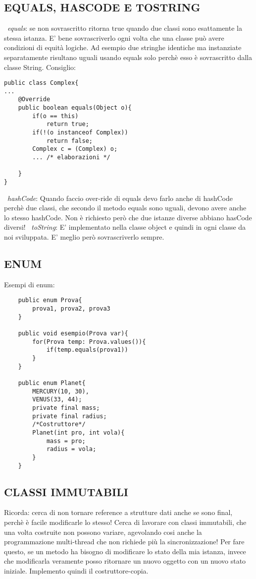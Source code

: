 \subsection{EQUALS, HASCODE E TOSTRING}
\noindent \textbullet\ \textit{equals}: se non sovrascritto ritorna true quando due classi sono esattamente la stessa istanza. E' bene sovrascriverlo ogni volta che una classe può avere condizioni di equità logiche. Ad esempio due stringhe identiche ma instanziate separatamente risultano uguali usando equals solo perchè esso è sovrascritto dalla classe String. Consiglio: 
\begin{lstlisting}
public class Complex{
...
	@Override
	public boolean equals(Object o){
		if(o == this)
			return true;
		if(!(o instanceof Complex))
			return false;
		Complex c = (Complex) o;
		... /* elaborazioni */	

	}
}
\end{lstlisting}
\noindent \textbullet\ \textit{hashCode}: Quando faccio over-ride di equals devo farlo anche di hashCode perchè due classi, che secondo il metodo equals sono uguali, devono avere anche lo stesso hashCode. Non è richiesto però che due istanze diverse abbiano hasCode diversi! \newline
\textbullet\ \textit{toString}: E' implementato nella classe object e quindi in ogni classe da noi sviluppata. E' meglio però sovrascriverlo sempre.

\subsection{ENUM}
\noindent Esempi di enum:
\begin{lstlisting}
	public enum Prova{
		prova1, prova2, prova3
	}
	
	public void esempio(Prova var){
		for(Prova temp: Prova.values()){
			if(temp.equals(prova1))
		}
	}
	
	public enum Planet{
		MERCURY(10, 30),
		VENUS(33, 44);
		private final mass;
		private final radius;
		/*Costruttore*/
		Planet(int pro, int vola){
			mass = pro;
			radius = vola;
		}
	}
\end{lstlisting}

\subsection{CLASSI IMMUTABILI}
\noindent Ricorda: cerca di non tornare reference a strutture dati anche se sono final, perchè è facile modificarle lo stesso! Cerca di lavorare con classi immutabili, che una volta costruite non possono variare, agevolando cosi anche la programmazione multi-thread che non richiede più la sincronizzazione! Per fare questo, se un metodo ha bisogno di modificare lo stato della mia istanza, invece che modificarla veramente posso ritornare un nuovo oggetto con un nuovo stato iniziale. Implemento quindi il costruttore-copia.

